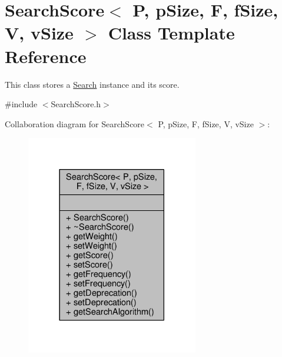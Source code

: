 \hypertarget{classSearchScore}{}\section{Search\+Score$<$ P, p\+Size, F, f\+Size, V, v\+Size $>$ Class Template Reference}
\label{classSearchScore}


This class stores a \hyperlink{classSearch}{Search} instance and its score.  




{\ttfamily \#include $<$Search\+Score.\+h$>$}



Collaboration diagram for Search\+Score$<$ P, p\+Size, F, f\+Size, V, v\+Size $>$\+:
\nopagebreak
\begin{figure}[H]
\begin{center}
\leavevmode
\includegraphics[width=213pt]{classSearchScore__coll__graph}
\end{center}
\end{figure}
